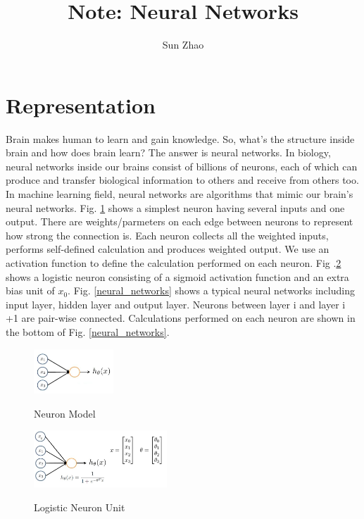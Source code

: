 \documentclass{article}
\title{Note: Neural Networks}
\author{Sun Zhao}
\begin{document}
\maketitle
\newpage

\section{Representation}
Brain makes human to learn and gain knowledge. So, what's the structure inside brain and how does brain learn? The answer is neural networks. In biology, neural networks inside our brains consist of billions of neurons, each of which can produce and transfer biological information to others and receive from others too. In machine learning field, neural networks are algorithms that mimic our brain's neural networks. Fig. \ref{neuron_model} shows a simplest neuron having several inputs and one output. There are weights/parmeters on each edge between neurons to represent how strong the connection is. Each neuron collects all the weighted inputs, performs self-defined calculation and produces weighted output. We use an activation function to define the calculation performed on each neuron. Fig .\ref{logistic_neuron_unit} shows a logistic neuron consisting of a sigmoid activation function and an extra bias unit of $x_{0}$. Fig. \ref{neural_networks} shows a typical neural networks including input layer, hidden layer and output layer. Neurons between layer i and layer i +1 are pair-wise connected. Calculations performed on each neuron are shown in the bottom of Fig. \ref{neural_networks}.
\begin{figure}[hb]
  \centering
  \includegraphics[width=3cm]{Figure1.jpg}\\
  \caption{Neuron Model}\label{neuron_model}
\end{figure}
\begin{figure}[hb]
  \centering
  \includegraphics[width=5cm]{Figure2.jpg}\\
  \caption{Logistic Neuron Unit}\label{logistic_neuron_unit}
\end{figure}
\end{document}
